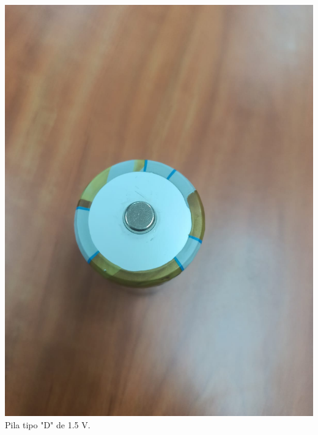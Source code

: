\documentclass[10pt]{article}
\begin{document}
\begin{multicols}{2}
\begin{center}
	\includegraphics[scale = 0.1]{Imagenes/Material/PilaD.jpeg}\\
	Pila tipo "D" de 1.5 V.


\end{center}
\end{multicols}
\end{document}
